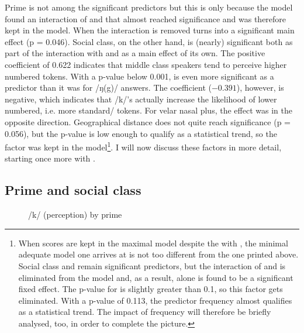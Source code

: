 Prime is not among the significant predictors but this is only because the model found an interaction of  and  that almost reached significance and was therefore kept in the model.
When the interaction is removed  turns into a significant main effect (p = 0.046).
Social class, on the other hand, is (nearly) significant both as part of the interaction with  and as a main effect of its own.
The positive coefficient of 0.622 indicates that middle class speakers tend to perceive higher numbered tokens.
With a p-value below 0.001,  is even more significant as a predictor than it was for /ŋ(g)/ answers.
The coefficient (\ensuremath{-0.391}), however, is negative, which indicates that  /k/'s actually increase the likelihood of lower numbered, i.e. more standard/ tokens.
For velar nasal plus, the effect was in the opposite direction.
Geographical distance does not quite reach significance (p = 0.056), but the p-value is low enough to qualify as a statistical trend, so the factor was kept in the model\footnote{When  scores are kept in the maximal model despite the  with , the minimal adequate model one arrives at is not too different from the one printed above. Social class and  remain significant predictors, but the interaction of  and  is eliminated from the model and, as a result,  alone is found to be a significant fixed effect. The p-value for  is slightly greater than 0.1, so this factor gets eliminated. With a p-value of 0.113, the predictor frequency almost qualifies as a statistical trend. The impact of frequency will therefore be briefly analysed, too, in order to complete the picture.}.
I will now discuss these factors in more detail, starting once more with .

\subsection{Prime and social class}
\label{sec.perc_res.k.prime}

\begin{figure}[h]
	\centering
		\resizebox{.49\linewidth}{!}{} 
	\caption{/k/ (perception) by prime}
	\label{fig.bar.k.tot.ext}
\end{figure}

